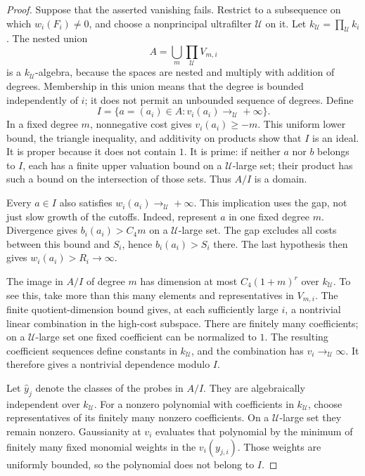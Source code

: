 \begin{proof}
Suppose that the asserted vanishing fails.  Restrict to a subsequence
on which $w_i(F_i)\ne0$, and choose a nonprincipal ultrafilter
$\mathcal U$ on it.  Let $k_{\mathcal U}=\prod_{\mathcal U}k_i$.
The nested union
\[
             A=\bigcup_m\prod_{\mathcal U}V_{m,i}
\]
is a $k_{\mathcal U}$-algebra, because the spaces are nested and
multiply with addition of degrees.  Membership in this union means
that the degree is bounded independently of $i$; it does not permit
an unbounded sequence of degrees.  Define
\[
 I=\{a=(a_i)\in A:
                   v_i(a_i)\longrightarrow_{\mathcal U}+\infty\}.
\]
In a fixed degree $m$, nonnegative cost gives $v_i(a_i)\ge-m$.
This uniform lower bound, the triangle inequality, and additivity
on products show that $I$ is an ideal.  It is proper because it
does not contain $1$.  It is prime: if neither $a$ nor $b$ belongs
to $I$, each has a finite upper valuation bound on a
$\mathcal U$-large set; their product has such a bound on the
intersection of those sets.  Thus $A/I$ is a domain.

Every $a\in I$ also satisfies
$w_i(a_i)\to_{\mathcal U}+\infty$.  This implication uses the
gap, not just slow growth of the cutoffs.  Indeed, represent $a$ in
one fixed degree $m$.  Divergence gives $b_i(a_i)>C_4m$ on a
$\mathcal U$-large set.  The gap excludes all costs between this
bound and $S_i$, hence $b_i(a_i)>S_i$ there.  The last hypothesis
then gives $w_i(a_i)>R_i\to\infty$.

The image in $A/I$ of degree $m$ has dimension at most
$C_4(1+m)^r$ over $k_{\mathcal U}$.  To see this, take more than
this many elements and representatives in $V_{m,i}$.  The finite
quotient-dimension bound gives, at each sufficiently large $i$, a
nontrivial linear combination in the high-cost subspace.  There
are finitely many coefficients; on a $\mathcal U$-large set one
fixed coefficient can be normalized to $1$.  The resulting
coefficient sequences define constants in $k_{\mathcal U}$, and
the combination has $v_i\to_{\mathcal U}\infty$.  It therefore
gives a nontrivial dependence modulo $I$.

Let $\widehat y_j$ denote the classes of the probes in $A/I$.
They are algebraically independent over $k_{\mathcal U}$.
For a nonzero polynomial with coefficients in $k_{\mathcal U}$,
choose representatives of its finitely many nonzero coefficients.
On a $\mathcal U$-large set they remain nonzero.  Gaussianity at
$v_i$ evaluates that polynomial by the minimum of finitely many
fixed monomial weights in the $v_i(y_{j,i})$.  Those weights are
uniformly bounded, so the polynomial does not belong to $I$.


\end{proof}
